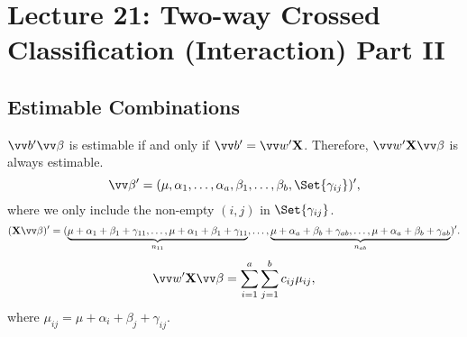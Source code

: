 \section{Lecture 21: Two-way Crossed Classification (Interaction) Part II}
\subsection*{Estimable Combinations}
$ \Vector{b}'\Vector{\beta} $ is estimable if and only if
$ \Vector{b}'=\Vector{w}'\Matrix{X} $. Therefore,
$ \Vector{w}'\Matrix{X}\Vector{\beta} $ is always estimable.
\[ \Vector{\beta}'=(\mu,\alpha_1,\ldots,\alpha_a,\beta_1,\ldots,\beta_b,\Set{\gamma_{ij}})', \]
where we only include the non-empty $ (i,j) $ in $ \Set{\gamma_{ij}} $.
\[ (\Matrix{X}\Vector{\beta})'=(\underbrace{\mu+\alpha_1+\beta_1+\gamma_{11},\ldots,\mu+\alpha_1+\beta_1+\gamma_{11}}_{n_{11}},
    \ldots,\underbrace{\mu+\alpha_a+\beta_b+\gamma_{ab},\ldots,\mu+\alpha_a+\beta_b+\gamma_{ab}}_{n_{ab}})'. \]
\[ \Vector{w}'\Matrix{X}\Vector{\beta}=\sum_{i=1}^{a}\sum_{j=1}^{b}c_{ij}\mu_{ij}, \]
where $ \mu_{ij}=\mu+\alpha_i+\beta_j+\gamma_{ij} $.
